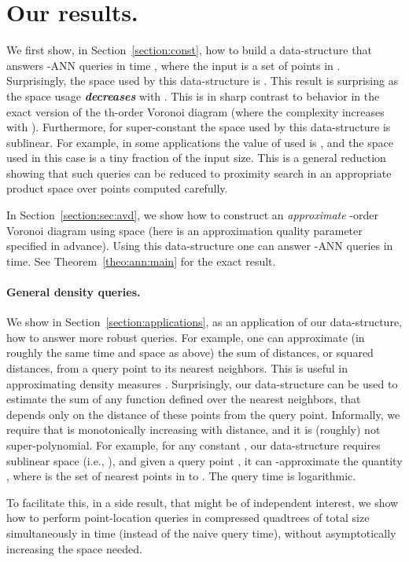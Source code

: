 \documentclass[12pt]{article}
\makeatletter
\newcommand{\emphic}[2]{\textcolor{blue25}{\textbf{\emph{#1}}}\index{#2}}
\newcommand{\emphi}[1]{\emphic{#1}{#1}}
\newcommand{\Term}[1]{\textsf{#1}}
\newcommand{\TermI}[1]{\Term{#1}\index{#1@\Term{#1}}}
\theoremstyle{remark}{\theorembodyfont{\rm} \newtheorem{remark}[theorem]{Remark}}
\newcommand{\thmref}[1]{Theorem~\ref{theo:#1}}
\newcommand{\secref}[1]{Section~\ref{section:#1}}
\newcommand{\ANN}{\TermI{ANN}\xspace}
\renewcommand{\th}{th\xspace}
\makeatother
\begin{document}
\section*{Our results.}

We first show, in \secref{const}, how to build a data-structure
that answers -\ANN queries in time , 
where the input is a
set of  points in . Surprisingly, the space used by this
data-structure is .  This result is surprising as the
space usage \emphi{decreases} with . This is in sharp contrast to
behavior in the exact version of the \th-order Voronoi diagram
(where the complexity increases with ). Furthermore, for
super-constant  the space used by this data-structure is
sublinear. For example, in some applications the value of  used is
, and the space used in this case is a tiny
fraction of the input size.  This is a general reduction showing that
such queries can be reduced to proximity search in an appropriate
product space over  points computed carefully.

In \secref{sec:avd}, we show how to construct an \emph{approximate}
-order Voronoi diagram using space  (here
 is an approximation quality parameter specified in
advance). Using this data-structure one can answer
-\ANN queries in 
time. See \thmref{ann:main} for the exact result.


\paragraph{General density queries.}
We show in \secref{applications}, as an application of our
data-structure, how to answer more robust queries.  For
example, one can approximate (in roughly the same time and space as
above) the sum of distances, or squared distances, from a query point
to its  nearest neighbors. This is useful in approximating density
measures \cite{dhs-pc-01}. Surprisingly, our data-structure can be
used to estimate the sum of any function  defined over the
 nearest neighbors, that depends only on the distance of these
points from the query point. Informally, we require that  is
monotonically increasing with distance, and it is (roughly) not
super-polynomial. For example, for any constant , our
data-structure requires sublinear space (i.e., ), and given a query point , it can
-approximate the quantity , where  is the set of  nearest points 
in  to . The query time is logarithmic.

To facilitate this, in a side result, that might be of independent
interest, we show how to perform point-location queries in 
compressed quadtrees of total size  simultaneously in  time (instead of the naive  query time), without
asymptotically increasing the space needed.
\end{document}

